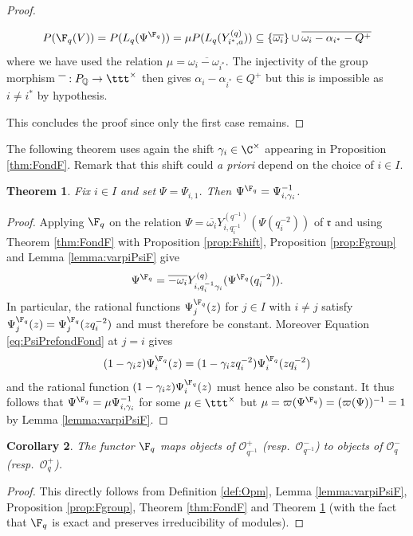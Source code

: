 \documentclass[11pt]{amsart}
\newtheorem{theorem}{Theorem}[section]
\newtheorem{cor}[theorem]{Corollary}
\theoremstyle{definition}
\theoremstyle{remark}
\numberwithin{equation}{section}
\begin{document}
\begin{proof}
\begin{itemize}
$$ P(\F_q(V)) = P(L_q(\Psi^{\F_q})) = \mu P(L_q(Y_{i^*,a}^{(q)})) \subseteq \{\overline{\omega_i}\}\cup \overline{\omega_i-\alpha_{i^*}-Q^+} $$
where we have used the relation $\mu = \overline{\omega_i-\omega_{i^*}}$. The injectivity of the group morphism $\overline{\textcolor{white}{\alpha}}:P_{\mathbb{Q}}\rightarrow \ttt^{\times}$ then gives $\alpha_i-\alpha_{i^*} \in Q^+$ but this is impossible as $i\neq i^*$ by hypothesis.
\end{itemize}
This concludes the proof since only the first case remains. 
\end{proof}
The following theorem uses again the shift $\gamma_i\in \C^{\times}$ appearing in Proposition \ref{thm:FondF}. Remark that this shift could \textit{a priori} depend on the choice of $i\in I$. 
\begin{theorem}\label{thm:preFondF}
Fix $i\in I$ and set $\Psi = \Psi_{i,1}$. Then $\Psi^{\F_q} = \Psi_{i,\gamma_i}^{-1}$.
\end{theorem}
\begin{proof} Applying $\F_q$ on the relation $\Psi =\overline{\omega_i}Y_{i,q_i^{-1}}^{(q^{-1})}(\Psi(q_i^{-2}))$ of $\mathfrak{r}$ and using Theorem \ref{thm:FondF} with Proposition \ref{prop:Fshift}, Proposition \ref{prop:Fgroup} and Lemma \ref{lemma:varpiPsiF} give
\begin{equation}\label{eq:PsiPrefondFond}
\Psi^{\F_q} = \overline{-\omega_i}Y_{i,q_i^{-1}\gamma_i}^{(q)}(\Psi^{\F_q}(q_i^{-2})).
\end{equation}
In particular, the rational functions $\Psi^{\F_q}_j(z)$ for $j\in I$ with $i\neq j$ satisfy $\Psi^{\F_q}_j(z) = \Psi^{\F_q}_j(zq_i^{-2})$ and must therefore be constant. Moreover Equation \eqref{eq:PsiPrefondFond} at $j=i$ gives
$$ (1-\gamma_iz)\Psi_i^{\F_q}(z) = (1-\gamma_i zq_i^{-2})\Psi_i^{\F_q}(zq_i^{-2})$$
and the rational function $(1-\gamma_iz)\Psi_i^{\F_q}(z)$ must hence also be constant. It thus follows that $\Psi^{\F_q} = \mu\Psi_{i,\gamma_i}^{-1}$ for some $\mu\in \ttt^{\times}$ but $\mu = \varpi(\Psi^{\F_q}) = (\varpi(\Psi))^{-1} = 1$ by Lemma \ref{lemma:varpiPsiF}. 
\end{proof}
\begin{cor} The functor $\F_q$ maps objects of $\mathcal{O}_{q^{-1}}^+$ (resp.~$\mathcal{O}_{q^{-1}}^-$) to objects of $\mathcal{O}_{q}^-$ (resp.~$\mathcal{O}_{q}^+$).
\end{cor}
\begin{proof}
This directly follows from Definition \ref{def:Opm}, Lemma \ref{lemma:varpiPsiF}, Proposition \ref{prop:Fgroup}, Theorem \ref{thm:FondF} and Theorem \ref{thm:preFondF} (with the fact that $\F_q$ is exact and preserves irreducibility of modules).
\end{proof}
\end{document}
